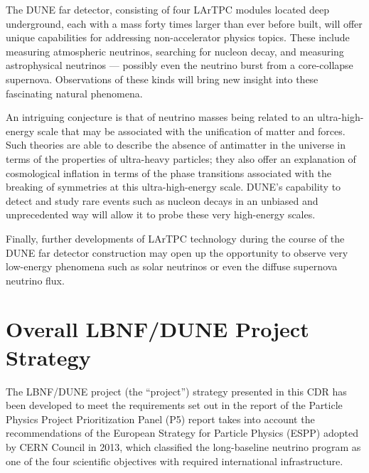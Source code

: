 The DUNE far detector, consisting of four LArTPC modules located deep underground, each with a mass forty times %
larger than ever before built,  
will offer unique capabilities for addressing %
non-accelerator physics topics. These include measuring atmospheric neutrinos, searching for nucleon decay, and measuring astrophysical neutrinos --- possibly even %
the neutrino burst %
from a core-collapse supernova. 
Observations of these kinds will bring new insight into these fascinating natural phenomena. 



An intriguing %
conjecture is that of neutrino masses being related to an %
ultra-high-energy scale that may be associated with the unification of matter and forces. Such theories are able to describe the absence of antimatter in the universe in terms of the properties of ultra-heavy particles; they also %
offer an explanation %
of cosmological inflation in terms of the phase transitions associated with the breaking of symmetries at this ultra-high-energy scale. DUNE's capability to detect and study rare events such as nucleon decays in an unbiased and unprecedented way will allow it to probe these very high-energy scales. 



Finally, further developments of LArTPC %
technology during the course of the DUNE far detector construction may open up the opportunity
to observe very low-energy phenomena such as solar neutrinos or even the diffuse supernova neutrino flux.



\section{Overall LBNF/DUNE Project Strategy} %

The LBNF/DUNE project (the ``project'') strategy presented in this CDR has been developed to meet the requirements 
set out in the report of the Particle Physics Project Prioritization Panel (P5) report 
takes into account the recommendations of the European Strategy for Particle 
Physics (ESPP) adopted by CERN Council in 2013, which classified the long-baseline neutrino program as 
one of the four scientific objectives with required international infrastructure.

